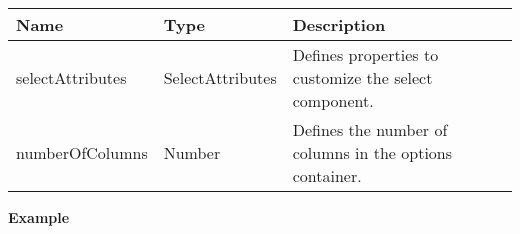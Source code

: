 \begin{table}[!htb] 
    \label{api:selectControllerParameter}
    \footnotesize
    \setlength\extrarowheight{4pt}
    \begin{tabular}{ p{3.2cm} p{3cm} p{6.8cm} }
        \toprule[1.2pt]
        \textbf{Name}    & \textbf{Type}       & \textbf{Description} \\
        \midrule
        selectAttributes & SelectAttributes & Defines properties to customize the select component. \\
        numberOfColumns  & Number           & Defines the number of columns in the options container. \\
        \bottomrule[1.2pt]
    \end{tabular}
\end{table}

\vspace*{6pt}
\noindent
\textbf{Example}

\begin{lstlisting}[style = htmlcssjs, label = api:selectControllerExample]

\end{lstlisting}